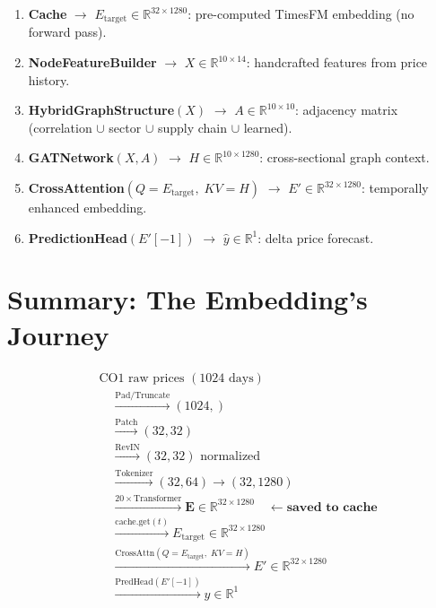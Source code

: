 \documentclass[11pt,a4paper]{article}
\begin{document}
\begin{enumerate}[nosep]
    \item \textbf{Cache} $\to$ $E_{\text{target}} \in \mathbb{R}^{32 \times 1280}$: pre-computed TimesFM embedding (no forward pass).
    \item \textbf{NodeFeatureBuilder} $\to$ $X \in \mathbb{R}^{10 \times 14}$: handcrafted features from price history.
    \item \textbf{HybridGraphStructure}$(X)$ $\to$ $A \in \mathbb{R}^{10 \times 10}$: adjacency matrix (correlation $\cup$ sector $\cup$ supply chain $\cup$ learned).
    \item \textbf{GATNetwork}$(X, A)$ $\to$ $H \in \mathbb{R}^{10 \times 1280}$: cross-sectional graph context.
    \item \textbf{CrossAttention}$(Q{=}E_{\text{target}},\; KV{=}H)$ $\to$ $E' \in \mathbb{R}^{32 \times 1280}$: temporally enhanced embedding.
    \item \textbf{PredictionHead}$(E'[-1])$ $\to$ $\hat{y} \in \mathbb{R}^{1}$: delta price forecast.
\end{enumerate}

\section{Summary: The Embedding's Journey}

\begin{equation*}
\boxed{
\begin{aligned}
&\text{CO1 raw prices } (1024 \text{ days}) \\
&\quad \xrightarrow{\text{Pad/Truncate}} (1024,) \\
&\quad \xrightarrow{\text{Patch}} (32, 32) \\
&\quad \xrightarrow{\text{RevIN}} (32, 32) \text{ normalized} \\
&\quad \xrightarrow{\text{Tokenizer}} (32, 64) \to (32, 1280) \\
&\quad \xrightarrow{20\times\text{Transformer}} \mathbf{E} \in \mathbb{R}^{32 \times 1280} \quad \leftarrow \textbf{saved to cache} \\
&\quad \xrightarrow{\text{cache.get}(t)} E_{\text{target}} \in \mathbb{R}^{32 \times 1280} \\
&\quad \xrightarrow{\text{CrossAttn}(Q{=}E_{\text{target}},\; KV{=}H)} E' \in \mathbb{R}^{32 \times 1280} \\
&\quad \xrightarrow{\text{PredHead}(E'[-1])} \hat{y} \in \mathbb{R}^{1}
\end{aligned}
}
\end{equation*}
\end{document}
